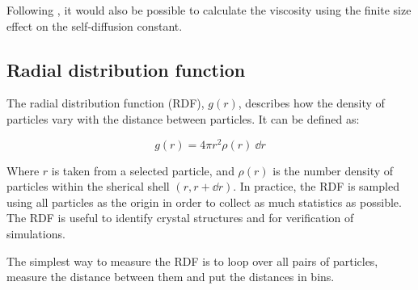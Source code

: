 Following \cite{Yeh2004}, it would also be possible to calculate the viscosity using the finite size effect on the self-diffusion constant.

\subsection{Radial distribution function}
The radial distribution function (RDF), $g(r)$, describes how the density of particles vary with the distance between particles. It can be defined as:

\begin{equation}
	g(r) = 4\pi r^2 \rho(r) \ \dd r
\end{equation}

Where $r$ is taken from a selected particle, and $\rho(r)$ is the number density of particles within the sherical shell $(r, r+\dd r)$. In practice, the RDF is sampled using all particles as the origin in order to collect as much statistics as possible. The RDF is useful to identify crystal structures and for verification of simulations. 

The simplest way to measure the RDF is to loop over all pairs of particles, measure the distance between them and put the distances in bins.


